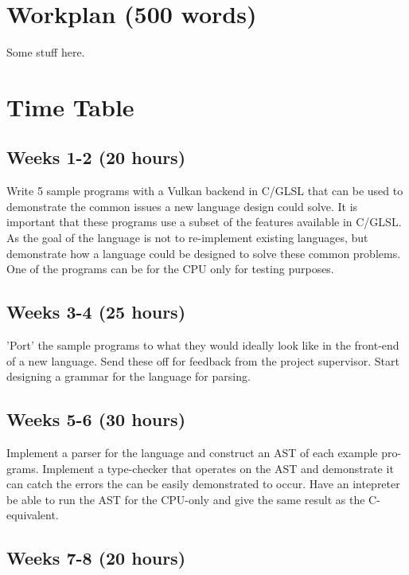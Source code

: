 \documentclass[11pt]{article}
\begin{document}
\section{Workplan (500 words)}

Some stuff here.




\newpage
\appendix

\section{Time Table}

\subsection{Weeks 1-2 (20 hours)}

Write 5 sample programs with a Vulkan backend in C/GLSL that can be used to
demonstrate the common issues a new language design could solve. It is
important that these programs use a subset of the features available in C/GLSL.
As the goal of the language is not to re-implement existing languages, but
demonstrate how a language could be designed to solve these common problems.
One of the programs can be for the CPU only for testing purposes.

\subsection{Weeks 3-4 (25 hours)}

'Port' the sample programs to what they would ideally look like in the
front-end of a new language. Send these off for feedback from the project
supervisor. Start designing a grammar for the language for parsing.

\subsection{Weeks 5-6 (30 hours)}

Implement a parser for the language and construct an AST of each example pro-
grams. Implement a type-checker that operates on the AST and demonstrate it can
catch the errors the can be easily demonstrated to occur. Have an intepreter be
able to run the AST for the CPU-only and give the same result as the
C-equivalent.

\subsection{Weeks 7-8 (20 hours)}
\end{document}
